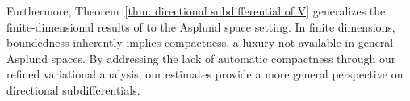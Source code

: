 \documentclass[12pt,twoside,reqno]{amsart}
\theoremstyle{definition}
\numberwithin{equation}{section}
\begin{document}
Furthermore, Theorem~\ref{thm: directional subdifferential of V} generalizes the finite-dimensional results of \cite[Theorems~3.1(iv) and~3.2(iv)]{Bai2023Directional} to the Asplund space setting. In finite dimensions, boundedness inherently implies compactness, a luxury not available in general Asplund spaces. By addressing the lack of automatic compactness through our refined variational analysis, our estimates provide a more general perspective on directional subdifferentials. 


\vskip 6mm

\noindent

%


\end{document}
